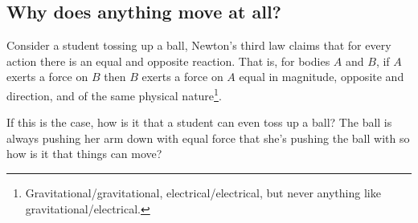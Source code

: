 \subsection{Why does anything move at all?}
Consider a student tossing up a ball, Newton's third law claims that for every action there is an equal and opposite reaction. That is, for bodies $A$ and $B$, if $A$ exerts a force on $B$ then $B$ exerts a force on $A$ equal in magnitude, opposite and direction, and of the same physical nature\footnote{Gravitational/gravitational, electrical/electrical, but never anything like gravitational/electrical.}. 

If this is the case, how is it that a student can even toss up a ball? The ball is always pushing her arm down with equal force that she's pushing the ball with so how is it that things can move?\\
\hspace*{15pt}{\scriptsize Credit: E. Mendez}